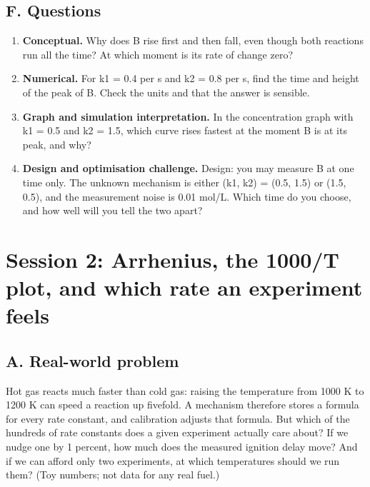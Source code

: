 \documentclass[11pt,a4paper]{article}
\begin{document}
\subsection*{F. Questions}
\begin{enumerate}[nosep]
\item \textbf{Conceptual.} Why does B rise first and then fall, even though both reactions run all the time? At which moment is its rate of change zero?
\item \textbf{Numerical.} For k1 = 0.4 per s and k2 = 0.8 per s, find the time and height of the peak of B. Check the units and that the answer is sensible.
\item \textbf{Graph and simulation interpretation.} In the concentration graph with k1 = 0.5 and k2 = 1.5, which curve rises fastest at the moment B is at its peak, and why?
\item \textbf{Design and optimisation challenge.} Design: you may measure B at one time only. The unknown mechanism is either (k1, k2) = (0.5, 1.5) or (1.5, 0.5), and the measurement noise is 0.01 mol/L. Which time do you choose, and how well will you tell the two apart?
\end{enumerate}

\section{Session 2: Arrhenius, the 1000/T plot, and which rate an experiment feels}

\subsection*{A. Real-world problem}
Hot gas reacts much faster than cold gas: raising the temperature from 1000 K to 1200 K can speed a reaction up fivefold. A mechanism therefore stores a formula for every rate constant, and calibration adjusts that formula. But which of the hundreds of rate constants does a given experiment actually care about? If we nudge one by 1 percent, how much does the measured ignition delay move? And if we can afford only two experiments, at which temperatures should we run them? (Toy numbers; not data for any real fuel.)
\end{document}

